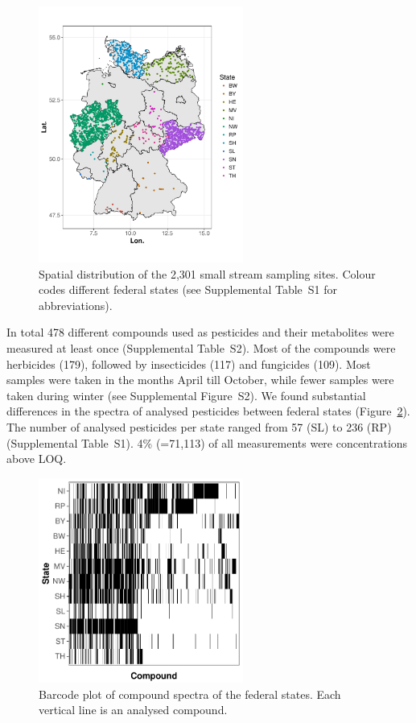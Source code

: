 \documentclass[journal=esthag,manuscript=article]{achemso}
\begin{document}
\begin{figure}[ht]
  \includegraphics[width=0.6\textwidth]{figure1.pdf}
  \caption{Spatial distribution of the 2,301 small stream sampling sites. Colour codes different federal states (see Supplemental Table~S1 for abbreviations).}
  \label{fig:fig1}
\end{figure}

In total 478 different compounds used as pesticides and their metabolites were measured at least once (Supplemental Table~S2). 
Most of the compounds were herbicides (179), followed by insecticides (117) and fungicides (109). %
Most samples were taken in the months April till October, while fewer samples were taken during winter (see Supplemental Figure~S2).
We found substantial differences in the spectra of analysed pesticides between federal states (Figure~\ref{fig:fig2}).
The number of analysed pesticides per state ranged from 57 (SL) to 236 (RP) (Supplemental Table~S1). 
4\% (=71,113) of all measurements were concentrations above LOQ.

\begin{figure}[ht]
  \includegraphics[width=0.6\textwidth]{figure2.pdf}
  \caption{Barcode plot of compound spectra of the federal states. Each vertical line is an analysed compound.}
  \label{fig:fig2}
\end{figure}
\end{document}
